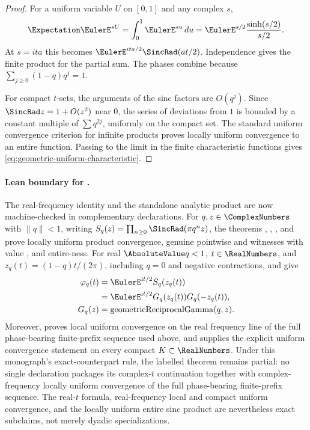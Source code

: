 \documentclass[11pt,a4paper,oneside,openany]{book}
\theoremstyle{definition}
\theoremstyle{remark}
\begin{document}
\begin{proof}
For a uniform variable $U$ on $[0,1]$ and any complex $s$,
\[
 \Expectation \EulerE^{sU}=\int_0^1\EulerE^{su}\,du
 =\EulerE^{s/2}\frac{\sinh(s/2)}{s/2}.
\]
At $s=ita$ this becomes
$\EulerE^{ita/2}\SincRad(at/2)$.  Independence gives the finite product for the partial sum.  The phases combine because
$\sum_{j\ge0}(1-q)q^j=1$.

For compact $t$-sets, the arguments of the sinc factors are $O(q^j)$.  Since
$\SincRad z=1+O(z^2)$ near $0$, the series of deviations from $1$ is bounded by a constant multiple of $\sum q^{2j}$, uniformly on the compact set.  The standard uniform convergence criterion for infinite products proves locally uniform convergence to an entire function.  Passing to the limit in the finite characteristic functions gives \eqref{eq:geometric-uniform-characteristic}.
\end{proof}

\paragraph{Lean boundary for .}
The real-frequency identity and the standalone analytic product are now
machine-checked in complementary declarations.  For $q,z\in\ComplexNumbers$ with
$\lVert q\rVert<1$, writing
$S_q(z)=\prod_{n\ge0}\SincRad(\pi q^nz)$, the theorems
,
,
, and
 prove locally uniform product
convergence, genuine pointwise  and  witnesses
with value , and entire-ness.  For real
$\AbsoluteValue q<1$, $t\in\RealNumbers$, and $z_q(t)=(1-q)t/(2\pi)$, including $q=0$ and
negative contractions,
and
give
\[
\begin{aligned}
 \varphi_q(t)
   &=\EulerE^{\mathrm i t/2}S_q(z_q(t)) \\
   &=\EulerE^{\mathrm i t/2}G_q(z_q(t))G_q(-z_q(t)), \\
 G_q(z)&=\operatorname{geometricReciprocalGamma}(q,z).
\end{aligned}
\]
Moreover,  proves local
uniform convergence on the real frequency line of the full phase-bearing
finite-prefix sequence used above, and
 supplies the explicit uniform
convergence statement on every compact \(K\subset\RealNumbers\).
Under this monograph's exact-counterpart rule, the labelled theorem remains
partial: no single declaration packages its complex-$t$ continuation together
with complex-frequency locally uniform convergence of the full phase-bearing
finite-prefix sequence.  The real-$t$ formula, real-frequency local and
compact uniform convergence, and the locally uniform entire sinc product are
nevertheless exact subclaims, not merely dyadic specializations.
\end{document}
